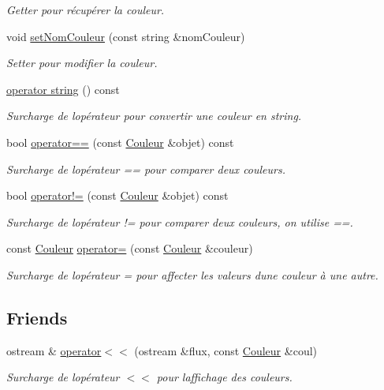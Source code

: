 \begin{DoxyCompactItemize}
\begin{DoxyCompactList}\small\item\em Getter pour récupérer la couleur. \end{DoxyCompactList}\item 
void \hyperlink{class_couleur_a571f1d6faacd4ee99f0180400ccb259d}{set\+Nom\+Couleur} (const string \&nom\+Couleur)
\begin{DoxyCompactList}\small\item\em Setter pour modifier la couleur. \end{DoxyCompactList}\item 
\hyperlink{class_couleur_acff55563e5760e4cea32ca275eb62205}{operator string} () const
\begin{DoxyCompactList}\small\item\em Surcharge de l\textquotesingle{}opérateur pour convertir une couleur en string. \end{DoxyCompactList}\item 
bool \hyperlink{class_couleur_a159c6c550e8855d6a44765ab5e0b0de8}{operator==} (const \hyperlink{class_couleur}{Couleur} \&objet) const
\begin{DoxyCompactList}\small\item\em Surcharge de l\textquotesingle{}opérateur == pour comparer deux couleurs. \end{DoxyCompactList}\item 
bool \hyperlink{class_couleur_a90eb18d425c9cd6a42814abb34c11183}{operator!=} (const \hyperlink{class_couleur}{Couleur} \&objet) const
\begin{DoxyCompactList}\small\item\em Surcharge de l\textquotesingle{}opérateur != pour comparer deux couleurs, on utilise ==. \end{DoxyCompactList}\item 
const \hyperlink{class_couleur}{Couleur} \hyperlink{class_couleur_af49bf608ba98af5f9dfe19fbe2759000}{operator=} (const \hyperlink{class_couleur}{Couleur} \&couleur)
\begin{DoxyCompactList}\small\item\em Surcharge de l\textquotesingle{}opérateur = pour affecter les valeurs d\textquotesingle{}une couleur à une autre. \end{DoxyCompactList}\end{DoxyCompactItemize}
\subsection*{Friends}
\begin{DoxyCompactItemize}
\item 
ostream \& \hyperlink{class_couleur_a8223b4eee2017fdd318d16692a16c636}{operator$<$$<$} (ostream \&flux, const \hyperlink{class_couleur}{Couleur} \&coul)
\begin{DoxyCompactList}\small\item\em Surcharge de l\textquotesingle{}opérateur $<$$<$ pour l\textquotesingle{}affichage des couleurs. \end{DoxyCompactList}\end{DoxyCompactItemize}


